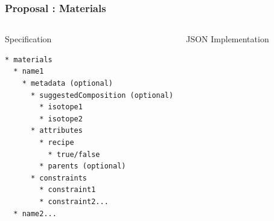 \begin{frame}[fragile]
  \frametitle{Proposal : Materials}
  \begin{columns}[t]
    \begin{block}{Specification}\begin{small}\begin{verbatim}
* materials
  * name1
    * metadata (optional)
      * suggestedComposition (optional)
        * isotope1
        * isotope2
      * attributes
        * recipe
          * true/false
        * parents (optional)
      * constraints
        * constraint1
        * constraint2...
  * name2...
    \end{verbatim}\end{small}\end{block}
    \begin{block}{JSON Implementation}\begin{small}\begin{semiverbatim}
      \end{semiverbatim}\end{small}\end{block}
  \end{columns}
\end{frame}

